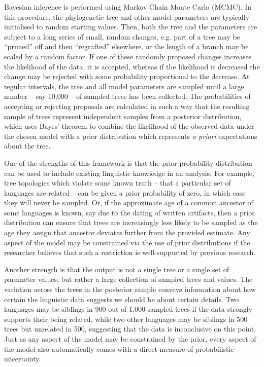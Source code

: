 \documentclass[10pt,a4paper]{article}
\begin{document}
Bayesian inference is performed using Markov Chain Monte Carlo (MCMC).  In this procedure, the phylogenetic tree and other model parameters are typically initialised to random starting values. Then, both the tree and the parameters are subject to a long series of small, random changes, e.g. part of a tree may be ``pruned'' off and then ``regrafted'' elsewhere, or the length of a branch may be scaled by a random factor.  If one of these randomly proposed changes increases the likelihood of the data, it is accepted, whereas if the likelihood is decreased the change may be rejected with some probability proportional to the decrease.  At regular intervals, the tree and all model parameters are sampled until a large number -- say 10,000 -- of sampled trees has been collected.  The probabilities of accepting or rejecting proposals are calculated in such a way that the resulting sample of trees represent independent samples from a posterior distribution, which uses Bayes' theorem to combine the likelihood of the observed data under the chosen model with a prior distribution which represents \emph{a priori} expectations about the tree.

One of the strengths of this framework is that the prior probability distribution can be used to include existing linguistic knowledge in an analysis.  For example, tree topologies which violate some known truth -- that a particular set of languages are related -- can be given a prior probability of zero, in which case they will never be sampled.  Or, if the approximate age of a common ancestor of some languages is known, say due to the dating of written artifacts, then a prior distribution can ensure that trees are increasingly less likely to be sampled as the age they assign that ancestor deviates further from the provided estimate.  Any aspect of the model may be constrained via the use of prior distributions if the researcher believes that such a restriction is well-supported by previous research.

Another strength is that the output is not a single tree or a single set of parameter values, but rather a large collection of sampled trees and values.  The variation across the trees in the posterior sample conveys information about how certain the linguistic data suggests we should be about certain details.  Two languages may be siblings in 900 out of 1,000 sampled trees if the data strongly supports their being related, while two other languages may be siblings in 500 trees but unrelated in 500, suggesting that the data is inconclusive on this point.  Just as any aspect of the model may be constrained by the prior, every aspect of the model also automatically comes with a direct measure of probabilistic uncertainty.
\end{document}
